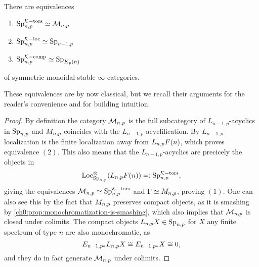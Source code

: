 \begin{proposition}
    \label{ch0:prop:torsion-is-monochromatic}
    There are equivalences
    \begin{enumerate}
        \item $\mathrm{Sp}_{n,p}^{\mathcal{K}-\mathrm{tors}}\simeq \mathcal{M}_{n,p}$
        \item $\mathrm{Sp}_{n,p}^{\mathcal{K}-\mathrm{loc}}\simeq \mathrm{Sp}_{n-1,p}$
        \item $\mathrm{Sp}_{n,p}^{\mathcal{K}-\mathrm{comp}}\simeq \mathrm{Sp}_{{K_p(n)}}$
    \end{enumerate} 
    of symmetric monoidal stable $\infty$-categories. 
\end{proposition}

These equivalences are by now classical, but we recall their arguments for the reader's convenience and for building intuition. 

\begin{proof}
    By definition the category $\mathcal{M}_{n,p}$ is the full subcategory of $L_{n-1,p}$-acyclics in $\mathrm{Sp}_{n,p}$ and $M_{n,p}$ coincides with the $L_{n-1,p}$-acyclification. By \cite[6.10]{hovey-strickland_99} $L_{n-1,p}$-localization is the finite localization away from $L_{n,p} F(n)$, which proves equivalence $(2)$. This also means that the $L_{n-1,p}$-acyclics are precicely the objects in 
    \[\operatorname{Loc}^\otimes_{\mathrm{Sp}_{n,p}}(L_{n,p} F(n))=:\mathrm{Sp}_{n,p}^{\mathcal{K}-\mathrm{tors}},\]
    giving the equivalences $\mathcal{M}_{n,p} \simeq \mathrm{Sp}_{n,p}^{\mathcal{K}-\mathrm{tors}}$ and $\Gamma \simeq M_{n,p}$, proving $(1)$. One can also see this by the fact that $M_{n,p}$ preserves compact objects, as it is smashing by \cref{ch0:prop:monochromatization-is-smashing}, which also implies that $\mathcal{M}_{n,p}$ is closed under colimits. The compact objects $L_{n,p} X\in \mathrm{Sp}_{n,p}$ for $X$ any finite spectrum of type $n$ are also monochromatic, as 
    \[E_{n-1,p *} L_{n,p} X \cong E_{n-1,p *}X\cong 0,\]
    and they do in fact generate $\mathcal{M}_{n,p}$ under colimits. 



    

\end{proof}
